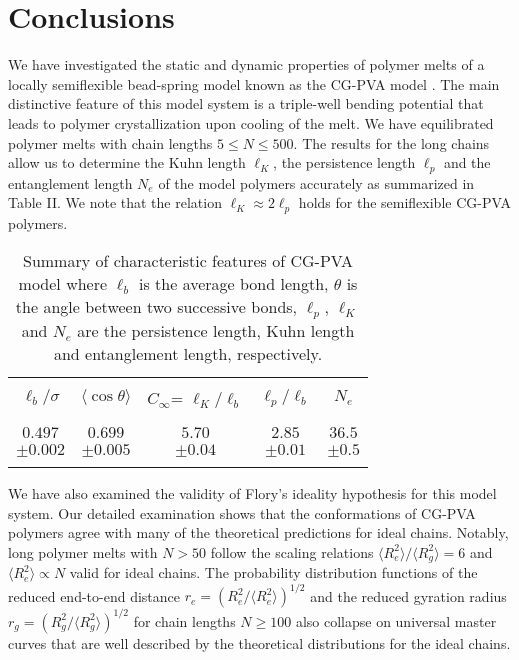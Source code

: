 \documentclass[pre,showpacs,notitlepage,twocolumn]{revtex4-1}
\begin{document}
 

 \section*{Conclusions}
 
  We have investigated the static and dynamic  properties of  polymer melts of a  locally semiflexible bead-spring model known as the CG-PVA model \cite{Meyer2001,Meyer2002}. The main distinctive 
 feature of this model system is a triple-well  bending potential that leads to polymer crystallization upon cooling of the melt. 
 We have equilibrated polymer melts  with  chain lengths $5\le N \le 500$. 
  The results for the  long chains allow us to determine  the Kuhn length $\ell_K$,  the persistence length $\ell_p$ and the entanglement length $N_e$ of the model polymers accurately  as summarized in Table II.
  We note that the relation   $\ell_K\approx 2\ell_p$ holds  for the semiflexible CG-PVA polymers.   
   
   \begin{table}[h] 
\begin{tabular}{ | c | c | c | c |  c|}
 \hline
  &   &   &   &     \\
   
$\ell_b/\sigma$ & $\langle \cos \theta \rangle$ & $C_{\infty}$= $\ell_K/\ell_b$ & $\ell_p/\ell_b$ & $N_e$ \\
 &   &   &   &     \\
  \hline
   &   &   &   &     \\
  $0.497 $ & $0.699 $  & $5.70$   & $2.85 $& $36.5 $ \\
   $\pm 0.002$ & $ \pm 0.005$  & $\pm 0.04$   & $ \pm 0.01$& $ \pm 0.5$ \\
   &    &   &  &   \\
   \hline
   \end{tabular}
  \caption{Summary of  characteristic features of CG-PVA model   
where $ \ell_b $ is the average bond length, $\theta$ is the angle between two successive bonds, $\ell_p$, $\ell_K$ and $N_e$ are the  persistence length,   Kuhn length  and
entanglement length, respectively. }
 \end{table} 
   
   
 
 We have also examined the validity of Flory's ideality hypothesis for this model
  system. Our detailed examination shows that the conformations of CG-PVA polymers agree with many of the theoretical predictions for ideal chains.
 Notably,  long polymer melts with $N>50$ follow the scaling relations $\langle R_e^2 \rangle/\langle R_g^2 \rangle=6$ and $\langle R_e^2 \rangle \propto N$  valid for ideal chains.
The probability distribution functions of the reduced end-to-end distance $r_e=(R_e^2/ \langle R_e^2 \rangle)^{1/2}$  and the reduced  gyration radius
$r_g=(R_g^2/ \langle R_g^2 \rangle)^{1/2}$    for chain lengths $N \ge 100$ also collapse on universal master curves that are well described by the theoretical distributions  for the 
ideal chains.  
\end{document}
